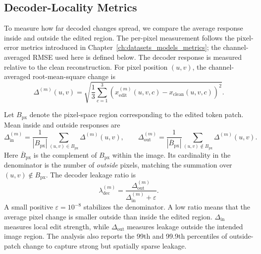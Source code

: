 \subsection{Decoder-Locality Metrics}
\label{subsec:rq4_decoder_locality_metrics}

To measure how far decoded changes spread, we compare the average response
inside and outside the edited region. The per-pixel measurement follows the
pixel-error metrics introduced in Chapter~\ref{ch:datasets_models_metrics};
the channel-averaged RMSE used here is defined below.
The decoder response is measured relative to the clean reconstruction. For
pixel position $(u,v)$, the channel-averaged root-mean-square change is
\begin{equation}
    \Delta^{(m)}(u,v)
    =
    \sqrt{
        \frac{1}{3}
        \sum_{c=1}^{3}
        \left(
            x_{\mathrm{edit}}^{(m)}(u,v,c)
            -
            x_{\mathrm{clean}}(u,v,c)
        \right)^2
    }.
    \label{eq:rq4_pixel_change}
\end{equation}

Let $B_{\mathrm{px}}$ denote the pixel-space region corresponding to the edited
token patch. Mean inside and outside responses are
\begin{equation}
    \Delta_{\mathrm{in}}^{(m)}
    =
    \frac{1}{|B_{\mathrm{px}}|}
    \sum_{(u,v)\in B_{\mathrm{px}}}
    \Delta^{(m)}(u,v),
    \qquad
    \Delta_{\mathrm{out}}^{(m)}
    =
    \frac{1}{|\overline{B}_{\mathrm{px}}|}
    \sum_{(u,v)\notin B_{\mathrm{px}}}
    \Delta^{(m)}(u,v).
    \label{eq:rq4_inside_outside_change}
\end{equation}
Here $\overline{B}_{\mathrm{px}}$ is the complement of $B_{\mathrm{px}}$
within the image. Its cardinality in the denominator is the number of
\emph{outside} pixels, matching the summation over $(u,v)\notin B_{\mathrm{px}}$.
The decoder leakage ratio is
\begin{equation}
    \lambda_{\mathrm{dec}}^{(m)}
    =
    \frac{\Delta_{\mathrm{out}}^{(m)}}
         {\Delta_{\mathrm{in}}^{(m)} + \varepsilon}.
    \label{eq:rq4_decoder_leakage}
\end{equation}
A small positive $\varepsilon=10^{-8}$ stabilizes the denominator. A low ratio means
that the average pixel change is smaller outside than inside the edited
region. $\Delta_{\mathrm{in}}$ measures local edit strength, while
$\Delta_{\mathrm{out}}$ measures leakage outside the intended image region. The analysis also reports the 99th and 99.9th percentiles of
outside-patch change to capture strong but spatially sparse leakage.

